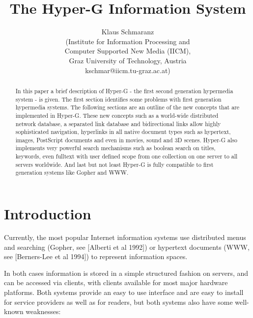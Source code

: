 
\textwidth15cm



\title{The Hyper-G Information System}

\author{Klaus Schmaranz\\
(Institute for Information Processing and\\
Computer Supported New Media (IICM),\\
Graz University of Technology, Austria\\
kschmar@iicm.tu-graz.ac.at)}

\maketitle


\begin{abstract}

In this paper a brief description of Hyper-G - the first second
generation hypermedia system - is given. The first section identifies
some problems with first generation hypermedia systems. The following
sections are an outline of the new concepts that are implemented in
Hyper-G. These new concepts such as a world-wide distributed network
database, a separated link database and bidirectional links allow
highly sophisticated navigation, hyperlinks in all native document
types such as hypertext, images, PostScript documents and even in
movies, sound and 3D scenes. Hyper-G also implements very powerful
search mechanisms such as boolean search on titles, keywords, even
fulltext with user defined scope from one collection on one server to
all servers worldwide. And last but not least Hyper-G is fully
compatible to first generation systems like Gopher and WWW.

\end{abstract}

\section{Introduction}

Currently, the most popular Internet information systems use
distributed menus and searching (Gopher, see [Alberti et al 1992]) or
hypertext documents (WWW, see [Berners-Lee et al 1994]) to represent
information spaces. 

In both cases information is stored in a simple structured fashion on
servers, and can be accessed via clients, with clients available for
most major hardware platforms. Both systems provide an easy to use
interface and are easy to install for service providers as well as for
readers, but both systems also have some well-known weaknesses:


